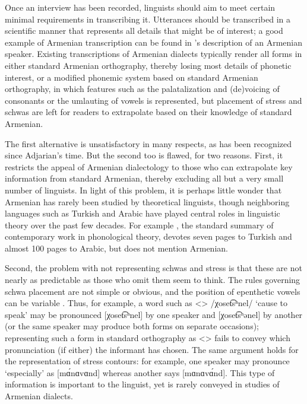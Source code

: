 \documentclass[output=paper]{langscibook}
\begin{document}
Once an interview has been recorded, linguists should aim to meet certain minimal requirements in transcribing it. Utterances should be transcribed in a scientific manner that represents all details that might be of interest; a good example of Armenian transcription can be found in \citeauthor{allen-1950-notesPhoneticsEasternArmenianSpeaker}'s \citeyear{allen-1950-notesPhoneticsEasternArmenianSpeaker} description of an Armenian speaker. Existing transcriptions of Armenian dialects typically render all forms in either standard Armenian orthography, thereby losing most details of phonetic interest, or a modified phonemic system based on standard Armenian orthography, in which features such as the palatalization and (de)voicing of consonants or the umlauting of vowels is represented, but placement of stress and schwas are left for readers to extrapolate based on their knowledge of standard Armenian. 

The first alternative is unsatisfactory in many respects, as has been recognized since Adjarian's time. But the second too is flawed, for two reasons. First, it restricts the appeal of Armenian dialectology to those who can extrapolate key information from standard Armenian, thereby excluding all but a very small number of linguists. In light of this problem, it is perhaps little wonder that Armenian has rarely been studied by theoretical linguists, though neighboring languages such as Turkish and Arabic have played central roles in linguistic theory over the past few decades. For example \citet{Kenstowicz-1994-Phonologygenerativegrammar}, the standard summary of contemporary work in phonological theory, devotes seven pages to Turkish and almost 100 pages to Arabic, but does not mention Armenian. 

Second, the problem with not representing schwas and stress is that these are not nearly as predictable as those who omit them seem to think. The rules governing schwa placement are not simple or obvious, and the position of epenthetic vowels can be variable \citep{Vaux-1998-ArmenianPhono,Dolatian-prep-Schwa}. Thus, for example, a word such as <> /χoset͡sʰnel/ `cause to speak' may be pronounced [χoset͡sʰnel] by one speaker and [χoset͡sʰənel] by another (or the same speaker may produce both forms on separate occasions); representing such a form in standard orthography as <> fails to convey which pronunciation (if either) the informant has chosen. The same argument holds for the representation of stress contours: for example, one speaker may pronounce `especially' as [mɑ́nɑvɑnd] whereas another says [mɑnɑvɑ́nd]. This type of information is important to the linguist, yet is rarely conveyed in studies of Armenian dialects.
\end{document}
